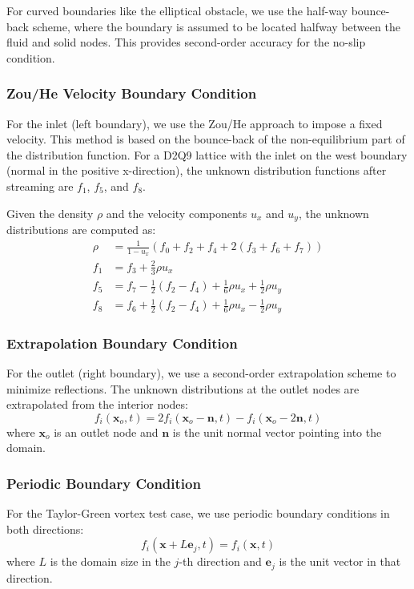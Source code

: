 \documentclass[12pt,a4paper]{article}
\begin{document}
For curved boundaries like the elliptical obstacle, we use the half-way bounce-back scheme, where the boundary is assumed to be located halfway between the fluid and solid nodes. This provides second-order accuracy for the no-slip condition.

\subsubsection{Zou/He Velocity Boundary Condition}
For the inlet (left boundary), we use the Zou/He approach to impose a fixed velocity. This method is based on the bounce-back of the non-equilibrium part of the distribution function. For a D2Q9 lattice with the inlet on the west boundary (normal in the positive x-direction), the unknown distribution functions after streaming are $f_1$, $f_5$, and $f_8$.

Given the density $\rho$ and the velocity components $u_x$ and $u_y$, the unknown distributions are computed as:
\begin{align}
\rho &= \frac{1}{1-u_x}(f_0 + f_2 + f_4 + 2(f_3 + f_6 + f_7))\\
f_1 &= f_3 + \frac{2}{3}\rho u_x\\
f_5 &= f_7 - \frac{1}{2}(f_2 - f_4) + \frac{1}{6}\rho u_x + \frac{1}{2}\rho u_y\\
f_8 &= f_6 + \frac{1}{2}(f_2 - f_4) + \frac{1}{6}\rho u_x - \frac{1}{2}\rho u_y
\end{align}

\subsubsection{Extrapolation Boundary Condition}
For the outlet (right boundary), we use a second-order extrapolation scheme to minimize reflections. The unknown distributions at the outlet nodes are extrapolated from the interior nodes:
\begin{equation}
f_i(\mathbf{x}_o, t) = 2f_i(\mathbf{x}_o - \mathbf{n}, t) - f_i(\mathbf{x}_o - 2\mathbf{n}, t)
\end{equation}
where $\mathbf{x}_o$ is an outlet node and $\mathbf{n}$ is the unit normal vector pointing into the domain.

\subsubsection{Periodic Boundary Condition}
For the Taylor-Green vortex test case, we use periodic boundary conditions in both directions:
\begin{equation}
f_i(\mathbf{x} + L\mathbf{e}_j, t) = f_i(\mathbf{x}, t)
\end{equation}
where $L$ is the domain size in the $j$-th direction and $\mathbf{e}_j$ is the unit vector in that direction.
\end{document}
